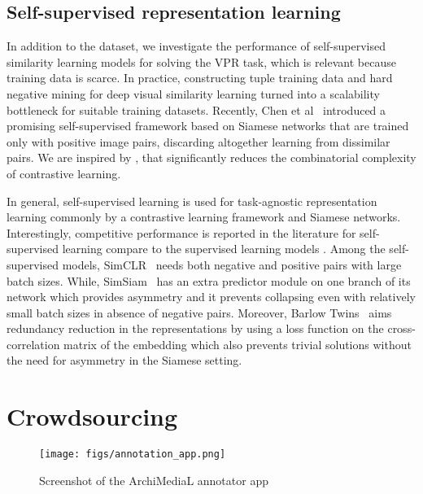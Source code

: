 \documentclass[a4paper,conference]{IEEEtran}
\begin{document}
\subsection{Self-supervised representation learning}
In addition to the dataset, we investigate the performance of self-supervised similarity learning models for solving the VPR task, which is relevant because training data is scarce. 
In practice, constructing tuple training data and hard negative mining for deep visual similarity learning turned into a scalability bottleneck for suitable training datasets. Recently, Chen et al~\cite{chen2020simsiam} introduced a promising self-supervised framework based on Siamese networks that are trained only with positive image pairs, discarding altogether learning from dissimilar pairs.  We are inspired by \cite{chen2020simsiam}, that significantly reduces the combinatorial complexity of contrastive learning.   


In general, self-supervised learning is used for task-agnostic representation learning \cite{caron2020unsupervised, he2020momentum, chen2020big, grill2020bootstrap, zbontar2021barlow, chen2020simsiam} commonly by a contrastive learning framework and Siamese networks. Interestingly, competitive performance is reported in the literature for self-supervised learning compare to the supervised learning models \cite{caron2020unsupervised, he2020momentum, chen2020big, grill2020bootstrap, zbontar2021barlow, chen2020simsiam}. Among the self-supervised models,  SimCLR~\cite{chen2020big} needs both negative and positive pairs with large batch sizes. 
While, SimSiam~\cite{chen2020simsiam} has an extra predictor module on one branch of its network which provides asymmetry and it prevents collapsing even with relatively small batch sizes in absence of negative pairs. Moreover, Barlow Twins~\cite{zbontar2021barlow} aims redundancy reduction in the representations by using a loss function on the cross-correlation matrix of the embedding which also prevents trivial solutions without the need for asymmetry in the Siamese setting. \section{Crowdsourcing \amstertime }
\label{sec:dataset}

\begin{figure}[t]
\centering
\texttt{[image: figs/annotation\_app.png]}
\caption{Screenshot of the ArchiMediaL annotator app}
\label{fig:app}
\end{figure}
\end{document}

